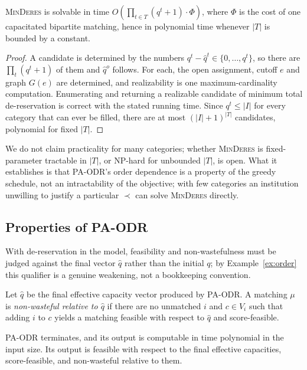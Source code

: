 \documentclass[runningheads]{llncs}
\begin{document}
\begin{proposition}
\label{prop:minderes}
\textsc{MinDeres} is solvable in time $O(\prod_{t\in T}(q^t+1)\cdot\Phi)$, where $\Phi$ is the cost of one capacitated bipartite matching, hence in polynomial time whenever $|T|$ is bounded by a constant.
\end{proposition}

\begin{proof}
A candidate is determined by the numbers $q^t-\hat q^t\in\{0,\dots,q^t\}$, so there are $\prod_t(q^t+1)$ of them and $\hat q^o$ follows. For each, the open assignment, cutoff $e$ and graph $G(e)$ are determined, and realizability is one maximum-cardinality computation. Enumerating and returning a realizable candidate of minimum total de-reservation is correct with the stated running time. Since $q^t\le|I|$ for every category that can ever be filled, there are at most $(|I|+1)^{|T|}$ candidates, polynomial for fixed $|T|$.
\end{proof}

We do not claim practicality for many categories; whether \textsc{MinDeres} is fixed-parameter tractable in $|T|$, or NP-hard for unbounded $|T|$, is open. What it establishes is that PA-ODR's order dependence is a property of the greedy schedule, not an intractability of the objective; with few categories an institution unwilling to justify a particular $\prec$ can solve \textsc{MinDeres} directly.

\subsection{Properties of PA-ODR}

With de-reservation in the model, feasibility and non-wastefulness must be judged against the final vector $\hat q$ rather than the initial $q$; by Example~\ref{ex:order} this qualifier is a genuine weakening, not a bookkeeping convention.

\begin{definition}
\label{def:nw-hat}
Let $\hat q$ be the final effective capacity vector produced by PA-ODR. A matching $\mu$ is \emph{non-wasteful relative to $\hat q$} if there are no unmatched $i$ and $c\in V_i$ such that adding $i$ to $c$ yields a matching feasible with respect to $\hat q$ and score-feasible.
\end{definition}

\begin{proposition}
\label{prop:paodr-basic}
PA-ODR terminates, and its output is computable in time polynomial in the input size. Its output is feasible with respect to the final effective capacities, score-feasible, and non-wasteful relative to them.
\end{proposition}
\end{document}
